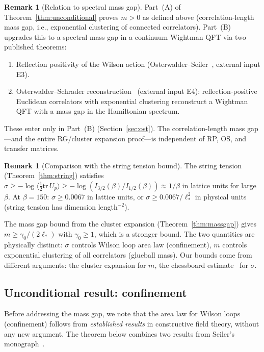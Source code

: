 \documentclass[11pt]{article}
\theoremstyle{definition}
\newtheorem{remark}[theorem]{Remark}
\newcommand{\tr}{\mathrm{tr}}
\begin{document}
\begin{remark}[Relation to spectral mass gap]%
\label{rem:OS-reconstruction}
Part~(A) of Theorem~\ref{thm:unconditional} proves $m>0$ as defined
above (correlation-length mass gap, i.e., exponential clustering
of connected correlators).  Part~(B) upgrades this to a spectral
mass gap in a continuum Wightman QFT via two published theorems:
\begin{enumerate}[nosep]
\item Reflection positivity of the Wilson action
(Osterwalder--Seiler~\cite{OS78}, external input E3).
\item Osterwalder--Schrader reconstruction~\cite{OS73}
(external input E4):
reflection-positive Euclidean correlators with exponential
clustering reconstruct a Wightman QFT with a mass gap in
the Hamiltonian spectrum.
\end{enumerate}
These enter only in Part~(B) (Section~\ref{sec:ost}).  The
correlation-length mass gap---and the entire RG/cluster
expansion proof---is independent of RP, OS, and transfer matrices.
\end{remark}

\begin{remark}[Comparison with the string tension bound]%
\label{rem:string-vs-gap}
The string tension (Theorem~\ref{thm:string}) satisfies
$\sigma\ge-\log\langle\frac{1}{2}\tr\,U_p\rangle
\ge-\log(I_{3/2}(\beta)/I_{1/2}(\beta))
\approx 1/\beta$ in lattice units for large $\beta$.
At $\beta=150$: $\sigma\ge 0.0067$ in lattice units, or
$\sigma\ge 0.0067/\ell_*^2$ in physical units (string tension
has dimension length$^{-2}$).

The mass gap bound from the cluster expansion
(Theorem~\ref{thm:massgap}) gives
$m\ge\gamma_0/(2\ell_*)$ with $\gamma_0\ge 1$, which is a
stronger bound.  The two quantities are physically distinct:
$\sigma$ controls Wilson loop area law (confinement),
$m$ controls exponential clustering of all correlators
(glueball mass).  Our bounds come from different arguments:
the cluster expansion for $m$, the chessboard
estimate~\cite[Theorem~6.1]{Seiler82} for $\sigma$.
\end{remark}

\subsection{Unconditional result: confinement}

Before addressing the mass gap, we note that the area law for Wilson
loops (confinement) follows from \emph{established results} in
constructive field theory, without any new argument.  The theorem
below combines two results from Seiler's
monograph~\cite{Seiler82}.
\end{document}

